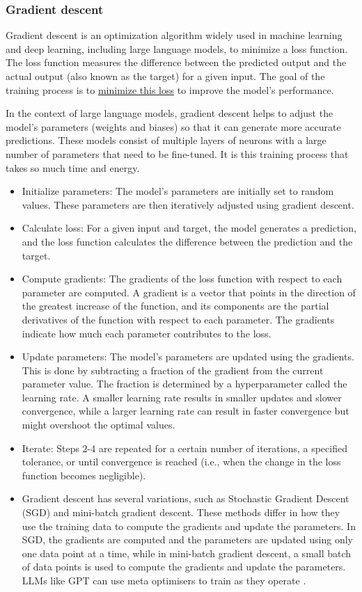 \subsubsection{Gradient descent}
Gradient descent is an optimization algorithm widely used in machine learning and deep learning, including large language models, to minimize a loss function. The loss function measures the difference between the predicted output and the actual output (also known as the target) for a given input. The goal of the training process is to \href{https://societyofai.medium.com/gradient-descent-basics-and-application-1cef98179ee6}{minimize this loss} to improve the model's performance.\par
In the context of large language models, gradient descent helps to adjust the model's parameters (weights and biases) so that it can generate more accurate predictions. These models consist of multiple layers of neurons with a large number of parameters that need to be fine-tuned. It is this training process that takes so much time and energy.
\begin{itemize}
\item Initialize parameters: The model's parameters are initially set to random values. These parameters are then iteratively adjusted using gradient descent.
\item Calculate loss: For a given input and target, the model generates a prediction, and the loss function calculates the difference between the prediction and the target.
\item Compute gradients: The gradients of the loss function with respect to each parameter are computed. A gradient is a vector that points in the direction of the greatest increase of the function, and its components are the partial derivatives of the function with respect to each parameter. The gradients indicate how much each parameter contributes to the loss.
\item Update parameters: The model's parameters are updated using the gradients. This is done by subtracting a fraction of the gradient from the current parameter value. The fraction is determined by a hyperparameter called the learning rate. A smaller learning rate results in smaller updates and slower convergence, while a larger learning rate can result in faster convergence but might overshoot the optimal values.
\item Iterate: Steps 2-4 are repeated for a certain number of iterations, a specified tolerance, or until convergence is reached (i.e., when the change in the loss function becomes negligible).
\item Gradient descent has several variations, such as Stochastic Gradient Descent (SGD) and mini-batch gradient descent. These methods differ in how they use the training data to compute the gradients and update the parameters. In SGD, the gradients are computed and the parameters are updated using only one data point at a time, while in mini-batch gradient descent, a small batch of data points is used to compute the gradients and update the parameters. LLMs like GPT can use meta optimisers to train as they operate \cite{dai2022can}.
\end{itemize}
